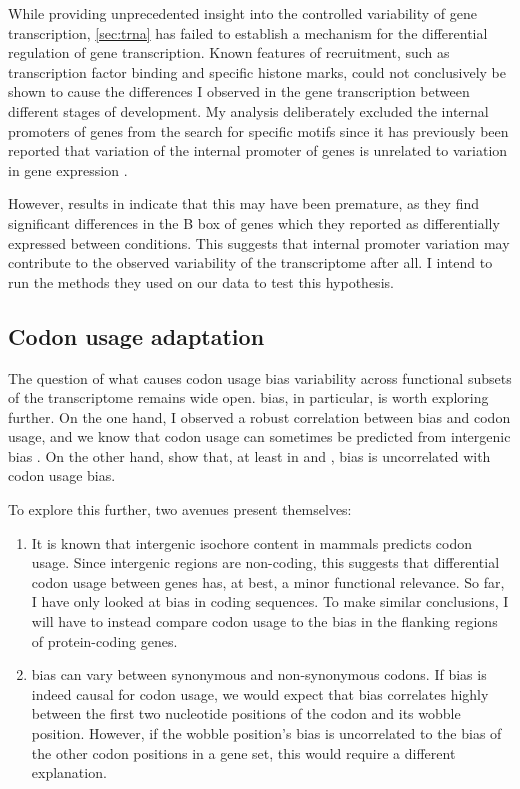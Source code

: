 While providing unprecedented insight into the controlled variability of \trna
gene transcription, \cref{sec:trna} has failed to establish a mechanism for the
differential regulation of \trna gene transcription. Known features of 
recruitment, such as transcription factor binding and specific histone marks,
could not conclusively be shown to cause the differences I observed in the \trna
gene transcription between different stages of development. My analysis
deliberately excluded the internal promoters of \trna genes from the search for
specific motifs since it has previously been reported that variation of the
internal promoter of \trna genes is unrelated to variation in gene expression
\citep{Oler:2010,Canella:2012}.

However, results in \citet{Gingold:2014} indicate that this may have been
premature, as they find significant differences in the B box of \trna genes
which they reported as differentially expressed between conditions. This
suggests that internal promoter variation may contribute to the observed
variability of the \trna transcriptome after all. I intend to run the methods
they used on our data to test this hypothesis.

\subsection{Codon usage adaptation}

The question of what causes codon usage bias variability across functional
subsets of the transcriptome remains wide open. \gc bias, in particular, is
worth exploring further. On the one hand, I observed a robust correlation
between \gc bias and codon usage, and we know that codon usage can sometimes be
predicted from intergenic \gc bias \citep{Chen:2004}. On the other hand,
\citet{Duret:2002} show that, at least in  and , \gc
bias is uncorrelated with codon usage bias.

To explore this further, two avenues present themselves:

\begin{enumerate}
    \item It is known that intergenic isochore \gc content in mammals predicts
        codon usage. Since intergenic regions are non-coding, this suggests that
        differential codon usage between genes has, at best, a minor functional
        relevance. So far, I have only looked at \gc bias in coding sequences.
        To make similar conclusions, I will have to instead compare codon usage
        to the \gc bias in the flanking regions of protein-coding genes.
    \item \gc bias can vary between synonymous and non-synonymous codons. If \gc
        bias is indeed causal for codon usage, we would expect that \gc bias
        correlates highly between the first two nucleotide positions of the
        codon and its wobble position. However, if the wobble position’s \gc
        bias is uncorrelated to the \gc bias of the other codon positions in a
        gene set, this would require a different explanation.
\end{enumerate}

